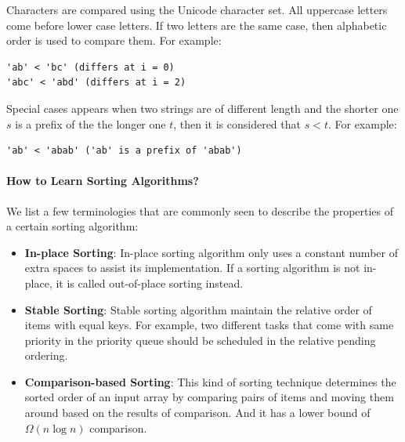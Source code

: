 \documentclass[../main.tex]{subfiles}
\begin{document}
Characters are compared using the Unicode character set. All uppercase letters come before lower case letters. If two letters are the same case, then alphabetic order is used to compare them. For example:
\begin{lstlisting}[numbers=none]
'ab' < 'bc' (differs at i = 0)
'abc' < 'abd' (differs at i = 2)
\end{lstlisting}
Special cases appears when two strings are of different length and the shorter one $s$ is a prefix of the the longer one $t$, then it is considered that $s < t$. For example: 
\begin{lstlisting}[numbers=none]
'ab' < 'abab' ('ab' is a prefix of 'abab')
\end{lstlisting} 

\paragraph{How to Learn Sorting Algorithms?} We list a few terminologies that are commonly seen to describe the properties of a certain sorting algorithm:
\begin{itemize}
    \item \textbf{In-place Sorting}: In-place sorting algorithm only uses a constant number of extra spaces to assist its implementation. If a sorting algorithm is not in-place, it is called out-of-place sorting instead. 
    \item \textbf{Stable Sorting}: Stable sorting algorithm maintain the relative order of items with equal keys. For example, two different tasks that come with same priority in the priority queue should be scheduled in the relative pending ordering.
    \item \textbf{Comparison-based Sorting}: This kind of sorting technique determines the sorted order of an input array by comparing pairs of items and moving them around based on the results of comparison. And it has a lower bound of $\Omega (n\log n)$ comparison. 
\end{itemize}
\end{document}
